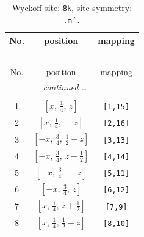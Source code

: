 \documentclass[fleqn,8pt]{jsarticle}
\begin{document}
\begin{longtable}{ccc}
\caption{Wyckoff site: {\tt 8k}, site symmetry: {\tt .m'.}}
 \\
 \hline \hline
No. & position & mapping \\ \hline \endfirsthead

\multicolumn{2}{l}{\tablename\ \thetable{}} \\
 \hline \hline
No. & position & mapping \\ \hline \endhead

 \hline \hline
\multicolumn{2}{r}{\footnotesize\it continued ...} \\ \endfoot

 \hline \hline
\multicolumn{2}{r}{} \\ \endlastfoot

1 & $\left[ x,\, \frac{1}{4},\, z \right]$ & {\tt [1,15]} \\ \hline
2 & $\left[ x,\, \frac{1}{4},\, - z \right]$ & {\tt [2,16]} \\ \hline
3 & $\left[ - x,\, \frac{3}{4},\, \frac{1}{2} - z \right]$ & {\tt [3,13]} \\ \hline
4 & $\left[ - x,\, \frac{3}{4},\, z + \frac{1}{2} \right]$ & {\tt [4,14]} \\ \hline
5 & $\left[ - x,\, \frac{3}{4},\, - z \right]$ & {\tt [5,11]} \\ \hline
6 & $\left[ - x,\, \frac{3}{4},\, z \right]$ & {\tt [6,12]} \\ \hline
7 & $\left[ x,\, \frac{1}{4},\, z + \frac{1}{2} \right]$ & {\tt [7,9]} \\ \hline
8 & $\left[ x,\, \frac{1}{4},\, \frac{1}{2} - z \right]$ & {\tt [8,10]} \\
\end{longtable}
\renewcommand{\arraystretch}{1.2}
\end{document}
